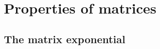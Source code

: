 









\section{Properties of matrices}

\subsection{The matrix exponential}
\label{sec:matrix-exponentials}

